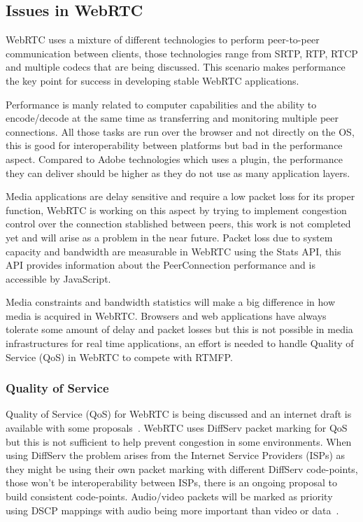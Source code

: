 \subsection{Issues in WebRTC}

WebRTC uses a mixture of different technologies to perform peer-to-peer communication between clients, those technologies range from SRTP, RTP, RTCP and multiple codecs that are being discussed. This scenario makes performance the key point for success in developing stable WebRTC applications. 

Performance is manly related to computer capabilities and the ability to encode/decode at the same time as transferring and monitoring multiple peer connections. All those tasks are run over the browser and not directly on the OS, this is good for interoperability between platforms but bad in the performance aspect. Compared to Adobe technologies which uses a plugin, the performance they can deliver should be higher as they do not use as many application layers.

Media applications are delay sensitive and require a low packet loss for its proper function, WebRTC is working on this aspect by trying to implement congestion control over the connection stablished between peers, this work is not completed yet and will arise as a problem in the near future. Packet loss due to system capacity and bandwidth are measurable in WebRTC using the Stats API, this API provides information about the PeerConnection performance and is accessible by JavaScript.

Media constraints and bandwidth statistics will make a big difference in how media is acquired in WebRTC. Browsers and web applications have always tolerate some amount of delay and packet losses but this is not possible in media infrastructures for real time applications, an effort is needed to handle Quality of Service (QoS) in WebRTC to compete with RTMFP.

\subsubsection{Quality of Service}

Quality of Service (QoS) for WebRTC is being discussed and an internet draft is available with some proposals~\cite{qosWebRTCIETF}. WebRTC uses DiffServ packet marking for QoS but this is not sufficient to help prevent congestion in some environments. When using DiffServ the problem arises from the Internet Service Providers (ISPs) as they might be using their own packet marking with different DiffServ code-points, those won't be interoperability between ISPs, there is an ongoing proposal to build consistent code-points. Audio/video packets will be marked as priority using DSCP mappings with audio being more important than video or data~\cite{qosWebRTCIETF}. 

